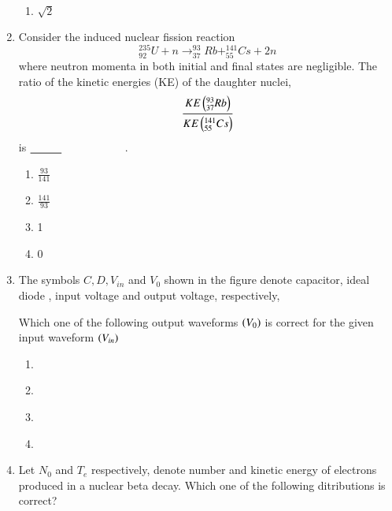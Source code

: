 \documentclass[journal,12pt,onecolumn]{IEEEtran}
\theoremstyle{remark}
\begin{document}
\begin{enumerate}
\begin{enumerate}
    \item $\sqrt{2}$
\end{enumerate}
\item Consider the induced nuclear fission reaction 
$$^{235}_{92}U+n\rightarrow^{93}_{37}Rb+^{141}_{55}Cs+2n$$ where neutron momenta in both initial and final states are negligible. The ratio of the kinetic energies (KE) of the daughter nuclei,
$$\frac{KE\left(^{93}_{37}Rb\right)}{KE\left(^{141}_{55}Cs\right)}$$ is  $\makebox[3cm][l]{\underline{\hspace{1cm}}}$.
\begin{enumerate}
    \item $\frac{93}{141}$
    \item $\frac{141}{93}$
    \item 1
    \item 0
\end{enumerate}
\item The symbols $C,D,V_{in}$ and $V_{0}$ shown in the figure denote capacitor, ideal diode , input voltage and output voltage, respectively,
\begin{figure}[!ht]
\centering
\resizebox{0.5\textwidth}{!}{%

}%
\end{figure}
Which one of the following output waveforms $\left(V_0\right)$ is correct for the given input waveform $\left(V_{in}\right)$
\begin{enumerate}
\item
	\begin{figure}[!ht]
\centering
\resizebox{0.2\textwidth}{!}{%

}%
\end{figure}
\item 
	\begin{figure}[!ht]
\centering
\resizebox{0.2\textwidth}{!}{%

}%
\end{figure}
\item 
	\begin{figure}[!ht]
\centering
\resizebox{0.2\textwidth}{!}{%

}%
\end{figure}
\item \begin{figure}[!ht]
\centering
\resizebox{0.2\textwidth}{!}{%

}%
\end{figure}
\end{enumerate}
\item Let $N_0$ and $T_e$ respectively, denote number and kinetic energy of electrons produced in a nuclear beta decay. Which one of the following ditributions is correct?

\end{enumerate}
\end{document}

